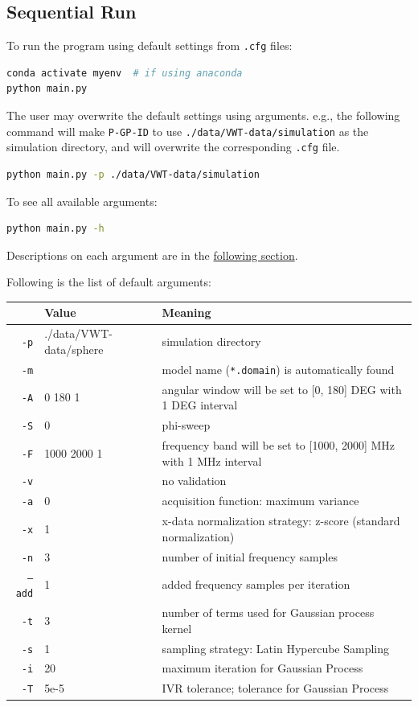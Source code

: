 

\subsection{Sequential Run}

To run the program using default settings from \texttt{.cfg} files:
\begin{lstlisting}[language=bash]
conda activate myenv  # if using anaconda
python main.py
\end{lstlisting}

\noindent 
The user may overwrite the default settings using arguments. e.g., the following command will make \texttt{P-GP-ID} to use \texttt{./data/VWT-data/simulation} as the simulation directory, and will overwrite the corresponding \texttt{.cfg} file.
\begin{lstlisting}[language=bash]
python main.py -p ./data/VWT-data/simulation
\end{lstlisting}

\noindent 
To see all available arguments:
\begin{lstlisting}[language=bash]
python main.py -h
\end{lstlisting}

\noindent Descriptions on each argument are in the \hyperref[SEC:args]{following section}.

\noindent Following is the list of default arguments:\\
\begin{tabular}{r | l | l}
  \hline \hline
   & Value & Meaning \\
  \hline
  \texttt{-p} & ./data/VWT-data/sphere & simulation directory \\
  \texttt{-m} &   & model name (\texttt{*.domain}) is automatically found \\
  \texttt{-A} & 0 180 1 & angular window will be set to [0, 180] DEG with 1 DEG interval \\
  \texttt{-S} & 0 & phi-sweep \\
  \texttt{-F} & 1000 2000 1 & frequency band will be set to [1000, 2000] MHz with 1 MHz interval \\
  \texttt{-v} &   & no validation \\
  \texttt{-a} & 0 & acquisition function: maximum variance \\
  \texttt{-x} & 1 & x-data normalization strategy: z-score (standard normalization) \\
  \texttt{-n} & 3 & number of initial frequency samples \\
  \texttt{--add} & 1 & added frequency samples per iteration \\
  \texttt{-t} & 3 & number of terms used for Gaussian process kernel \\
  \texttt{-s} & 1 & sampling strategy: Latin Hypercube Sampling \\
  \texttt{-i} & 20 & maximum iteration for Gaussian Process \\
  \texttt{-T} & 5e-5 & IVR tolerance; tolerance for Gaussian Process \\
  \hline \hline
\end{tabular}



